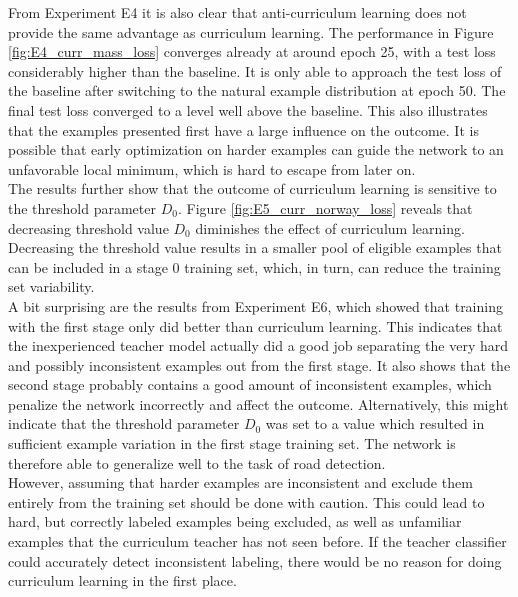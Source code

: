 From Experiment E4 it is also clear that anti-curriculum learning does not provide the same advantage as curriculum learning. The performance in Figure \ref{fig:E4_curr_mass_loss} converges already at around epoch 25, with a test loss considerably higher than the baseline. It is only able to approach the test loss of the baseline after switching to the natural example distribution at epoch 50. The final test loss converged to a level well above the baseline. This also illustrates that the examples presented first have a large influence on the outcome. It is possible that early optimization on harder examples can guide the network to an unfavorable local minimum, which is hard to escape from later on.\\

The results further show that the outcome of curriculum learning is sensitive to the threshold parameter $D_0$. Figure \ref{fig:E5_curr_norway_loss} reveals that decreasing threshold value $D_0$ diminishes the effect of curriculum learning. Decreasing the threshold value results in a smaller pool of eligible examples that can be included in a stage 0 training set, which, in turn, can reduce the training set variability.\\ 

A bit surprising are the results from Experiment E6, which showed that training with the first stage only did better than curriculum learning. This indicates that the inexperienced teacher model actually did a good job separating  the very hard and possibly inconsistent examples out from the first stage. It also shows that the second stage probably contains a good amount of inconsistent examples, which penalize the network incorrectly and affect the outcome. Alternatively, this might indicate that the threshold parameter $D_0$ was set to a value which resulted in sufficient example variation in the first stage training set. The network is therefore able to generalize well to the task of road detection.\\

However, assuming that harder examples are inconsistent and exclude them entirely from the training set should be done with caution. This could lead to hard, but correctly labeled examples being excluded, as well as unfamiliar examples that the curriculum teacher has not seen before. If the teacher classifier could accurately detect inconsistent labeling, there would be no reason for doing curriculum learning in the first place.\\ 

